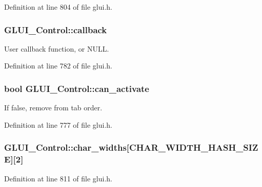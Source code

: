 Definition at line 804 of file glui.\+h.

\hypertarget{class_g_l_u_i___control_a96060fe0cc6d537e736dd6eef78e24ab}{
\subsubsection[{callback}]{ G\+L\+U\+I\+\_\+\+Control\+::callback}}\label{class_g_l_u_i___control_a96060fe0cc6d537e736dd6eef78e24ab}


User callback function, or N\+U\+L\+L. 



Definition at line 782 of file glui.\+h.

\hypertarget{class_g_l_u_i___control_a2484b0899bd5b56673a73387c9c530a7}{
\subsubsection[{can\+\_\+activate}]{\setlength{\rightskip}{0pt plus 5cm}bool G\+L\+U\+I\+\_\+\+Control\+::can\+\_\+activate}}\label{class_g_l_u_i___control_a2484b0899bd5b56673a73387c9c530a7}


If false, remove from tab order. 



Definition at line 777 of file glui.\+h.

\hypertarget{class_g_l_u_i___control_a3b24d8c0f29ab6fc2318278543906cb5}{
\subsubsection[{char\+\_\+widths}]{ G\+L\+U\+I\+\_\+\+Control\+::char\+\_\+widths\mbox{[}{\bf C\+H\+A\+R\+\_\+\+W\+I\+D\+T\+H\+\_\+\+H\+A\+S\+H\+\_\+\+S\+I\+Z\+E}\mbox{]}\mbox{[}2\mbox{]}}}\label{class_g_l_u_i___control_a3b24d8c0f29ab6fc2318278543906cb5}


Definition at line 811 of file glui.\+h.

